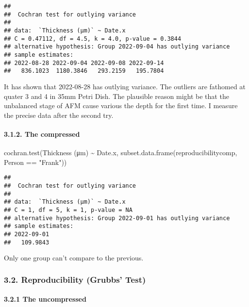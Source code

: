\documentclass[
]{article}
\newenvironment{Shaded}{\begin{snugshade}}{\end{snugshade}}
\newcommand{\AttributeTok}[1]{\textcolor[rgb]{0.77,0.63,0.00}{#1}}
\newcommand{\FunctionTok}[1]{\textcolor[rgb]{0.00,0.00,0.00}{#1}}
\newcommand{\NormalTok}[1]{#1}
\newcommand{\SpecialCharTok}[1]{\textcolor[rgb]{0.00,0.00,0.00}{#1}}
\newcommand{\StringTok}[1]{\textcolor[rgb]{0.31,0.60,0.02}{#1}}
\begin{document}
\begin{verbatim}
## 
##  Cochran test for outlying variance
## 
## data:  `Thickness (μm)` ~ Date.x
## C = 0.47112, df = 4.5, k = 4.0, p-value = 0.3844
## alternative hypothesis: Group 2022-09-04 has outlying variance
## sample estimates:
## 2022-08-28 2022-09-04 2022-09-08 2022-09-14 
##   836.1023  1180.3846   293.2159   195.7804
\end{verbatim}

It has shown that 2022-08-28 has outlying variance. The outliers are
fathomed at quater 3 and 4 in 35mm Petri Dish. The plausible reason
might be that the unbalanced stage of AFM cause various the depth for
the first time. I measure the precise data after the second try.

\hypertarget{the-compressed}{%
\paragraph{3.1.2. The compressed}\label{the-compressed}}

\begin{Shaded}
\begin{Highlighting}[]
\FunctionTok{cochran.test}\NormalTok{(}\StringTok{\textasciigrave{}}\AttributeTok{Thickness (μm)}\StringTok{\textasciigrave{}} \SpecialCharTok{\textasciitilde{}}\NormalTok{ Date.x, }\FunctionTok{subset.data.frame}\NormalTok{(reproducibilitycomp, Person }\SpecialCharTok{==} \StringTok{"Frank"}\NormalTok{))}
\end{Highlighting}
\end{Shaded}

\begin{verbatim}
## 
##  Cochran test for outlying variance
## 
## data:  `Thickness (μm)` ~ Date.x
## C = 1, df = 5, k = 1, p-value = NA
## alternative hypothesis: Group 2022-09-01 has outlying variance
## sample estimates:
## 2022-09-01 
##   109.9843
\end{verbatim}

Only one group can't compare to the previous.

\hypertarget{reproducibility-grubbs-test}{%
\subsubsection{3.2. Reproducibility (Grubbs'
Test)}\label{reproducibility-grubbs-test}}

\hypertarget{the-uncompressed-1}{%
\paragraph{3.2.1 The uncompressed}\label{the-uncompressed-1}}
\end{document}
